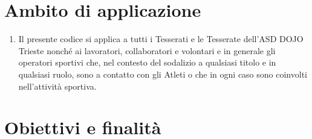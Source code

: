 \documentclass{djtsasddoc}
\begin{document}
	\section{Ambito di applicazione}
	\begin{enumerate}
		\item Il presente codice si applica a tutti i Tesserati e le Tesserate dell'ASD DOJO Trieste nonché ai lavoratori, collaboratori e volontari e in generale gli operatori sportivi che, nel contesto del sodalizio a qualsiasi titolo e in qualsiasi ruolo, sono a contatto con gli Atleti o che in ogni caso sono coinvolti nell'attività sportiva.
	\end{enumerate}
	
	\section{Obiettivi e finalità}
\end{document}
